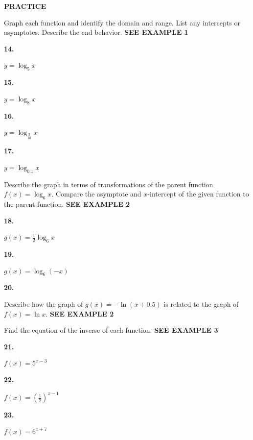 \documentclass{article}
\newenvironment{practice}[2]{\textbf{#1.}\par}{\par}
\newcommand{\answer}[1]{}
\begin{document}
\vspace{1em}
\textbf{PRACTICE}

Graph each function and identify the domain and range. List any intercepts or asymptotes. Describe the end behavior. \textbf{SEE EXAMPLE 1}

\begin{practice}{14}{}
$y = \log_5 x$
\answer{}
\end{practice}

\begin{practice}{15}{}
$y = \log_8 x$
\answer{}
\end{practice}

\begin{practice}{16}{}
$y = \log_{\frac{3}{10}} x$
\answer{}
\end{practice}

\begin{practice}{17}{}
$y = \log_{0.1} x$
\answer{}
\end{practice}

Describe the graph in terms of transformations of the parent function $f(x) = \log_6 x$. Compare the asymptote and $x$-intercept of the given function to the parent function. \textbf{SEE EXAMPLE 2}

\begin{practice}{18}{}
$g(x) = \frac{1}{2} \log_6 x$
\answer{}
\end{practice}

\begin{practice}{19}{}
$g(x) = \log_6 (-x)$
\answer{}
\end{practice}

\begin{practice}{20}{}
Describe how the graph of $g(x) = -\ln(x + 0.5)$ is related to the graph of $f(x) = \ln x$. \textbf{SEE EXAMPLE 2}
\answer{}
\end{practice}

Find the equation of the inverse of each function. \textbf{SEE EXAMPLE 3}

\begin{practice}{21}{}
$f(x) = 5^{x-3}$
\answer{}
\end{practice}

\begin{practice}{22}{}
$f(x) = \left(\frac{1}{2}\right)^{x-1}$
\answer{}
\end{practice}

\begin{practice}{23}{}
$f(x) = 6^{x+7}$
\answer{}
\end{practice}
\end{document}
